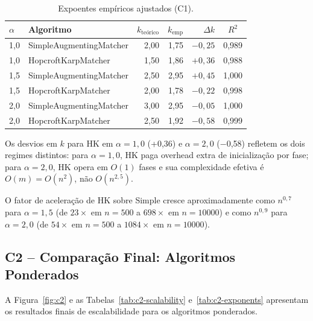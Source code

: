 \documentclass{infufrgs}
\begin{document}
\begin{table}[H]
\centering
\caption{Expoentes empíricos ajustados (C1).}
\label{tab:c1-exponents}
\begin{tabular}{llrrrc}
\toprule
$\alpha$ & Algoritmo & $k_\text{teórico}$ & $k_\text{emp}$ & $\Delta k$ & $R^2$ \\
\midrule
1{,}0 & SimpleAugmentingMatcher & 2{,}00 & 1{,}75 & $-0{,}25$ & 0{,}989 \\
1{,}0 & HopcroftKarpMatcher     & 1{,}50 & 1{,}86 & $+0{,}36$ & 0{,}988 \\
1{,}5 & SimpleAugmentingMatcher & 2{,}50 & 2{,}95 & $+0{,}45$ & 1{,}000 \\
1{,}5 & HopcroftKarpMatcher     & 2{,}00 & 1{,}78 & $-0{,}22$ & 0{,}998 \\
2{,}0 & SimpleAugmentingMatcher & 3{,}00 & 2{,}95 & $-0{,}05$ & 1{,}000 \\
2{,}0 & HopcroftKarpMatcher     & 2{,}50 & 1{,}92 & $-0{,}58$ & 0{,}999 \\
\bottomrule
\end{tabular}
\end{table}

Os desvios em $k$ para HK em $\alpha = 1{,}0$ (+0,36) e $\alpha = 2{,}0$ ($-$0,58) refletem os dois regimes distintos: para $\alpha = 1{,}0$, HK paga overhead extra de inicialização por fase; para $\alpha = 2{,}0$, HK opera em $O(1)$ fases e sua complexidade efetiva é $O(m) = O(n^2)$, não $O(n^{2{,}5})$.

O fator de aceleração de HK sobre Simple cresce aproximadamente como $n^{0{,}7}$ para $\alpha = 1{,}5$ (de $23\times$ em $n=500$ a $698\times$ em $n=10000$) e como $n^{0{,}9}$ para $\alpha = 2{,}0$ (de $54\times$ em $n=500$ a $1084\times$ em $n=10000$).

\subsection{C2 -- Comparação Final: Algoritmos Ponderados}

A Figura~\ref{fig:c2} e as Tabelas~\ref{tab:c2-scalability} e~\ref{tab:c2-exponents} apresentam os resultados finais de escalabilidade para os algoritmos ponderados.
\end{document}
